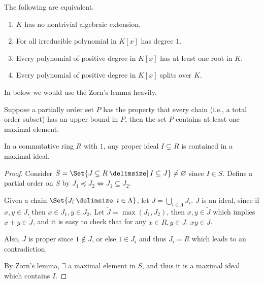 \begin{prop}
  The following are equivalent.
  \begin{enumerate}
    \item $K$ has no nontrivial algebraic extension.
    \item For all irreducible polynomial in $K[x]$ has degree $1$.
    \item Every polynomial of  positive degree in $K[x]$ has at least one root in $K$.
    \item Every polynomial of  positive degree in $K[x]$ splits over $K$.
  \end{enumerate}
\end{prop}

In below we would use the Zorn's lemma heavily.
\begin{lemma}
  Suppose a partially order set $P$ has the property that every chain (i.e., a total order subset)
  has an upper bound in $P$, then the set $P$ contains at least one maximal element.
\end{lemma}

\begin{lemma} \label{lemma:max-ideal-exists}
  In a commutative ring $R$ with $1$, any proper ideal $I \subsetneq R$ is contained in a maximal ideal.

  \begin{proof}
    Consider $S = \Set{J \subsetneq R \given I \subseteq J} \neq \varnothing$ since $I \in S$.
    Define a partial order on $S$ by $J_1 \preceq J_2 \iff J_1 \subseteq J_2$.

    Given a chain $\Set{J_i \given i \in \Lambda}$, let $J = \bigcup_{i \in \Lambda} J_i$. $J$ is an
    ideal, since if $x, y \in J$, then $x \in J_1, y \in J_2$.
    Let $\tilde{J} = \max(J_1, J_2)$, then $x, y \in \tilde{J}$
    which implies $x + y \in \tilde{J}$, and it is easy to check that for any $x \in R, y \in J$, $xy \in J$.

    Also, $J$ is proper since $1 \not\in J$, or else $1 \in J_i$ and thus $J_i = R$ which leads to
    an contradiction.

    By Zorn's lemma, $\exists$ a maximal element in $S$, and thus it is a maximal ideal which contains $I$.
  \end{proof}
\end{lemma}

